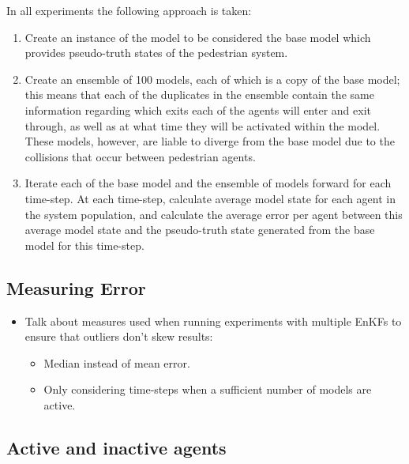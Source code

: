 \documentclass{article}
\begin{document}
In all experiments the following approach is taken:
\begin{enumerate}
    \item Create an instance of the model to be considered the base model which
        provides pseudo-truth states of the pedestrian system.
    \item Create an ensemble of 100 models, each of which is a copy of the base
        model; this means that each of the duplicates in the ensemble contain
        the same information regarding which exits each of the agents will enter
        and exit through, as well as at what time they will be activated within
        the model. These models, however, are liable to diverge from the base
        model due to the collisions that occur between pedestrian agents.
    \item Iterate each of the base model and the ensemble of models forward for
        each time-step. At each time-step, calculate average model state for
        each agent in the system population, and calculate the average error per
        agent between this average model state and the pseudo-truth state
        generated from the base model for this time-step.
\end{enumerate}


\subsection{Measuring Error}\label{sec:error}

\begin{itemize}
    \item Talk about measures used when running experiments with multiple EnKFs
        to ensure that outliers don't skew results:
    \begin{itemize}
        \item Median instead of mean error.
        \item Only considering time-steps when a sufficient number of models are
            active.
    \end{itemize}
\end{itemize}

\subsection{Active and inactive agents}
\end{document}
